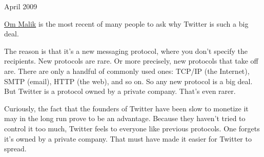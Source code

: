 April 2009

\href{http://gigaom.com/2009/04/03/google-may-buy-twitter-or-not-but-why-is-twitter-so-hot/}{Om
Malik} is the most recent of many people to ask why Twitter is such a
big deal.

The reason is that it's a new messaging protocol, where you don't
specify the recipients. New protocols are rare. Or more precisely, new
protocols that take off are. There are only a handful of commonly used
ones: TCP/IP (the Internet), SMTP (email), HTTP (the web), and so on. So
any new protocol is a big deal. But Twitter is a protocol owned by a
private company. That's even rarer.

Curiously, the fact that the founders of Twitter have been slow to
monetize it may in the long run prove to be an advantage. Because they
haven't tried to control it too much, Twitter feels to everyone like
previous protocols. One forgets it's owned by a private company. That
must have made it easier for Twitter to spread.
